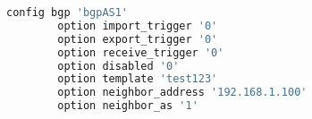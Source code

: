 \begin{lstlisting}[language=bash,caption={Tied options using UCI (I)}]
config bgp 'bgpAS1'
        option import_trigger '0'
        option export_trigger '0'
        option receive_trigger '0'
        option disabled '0'
        option template 'test123'
        option neighbor_address '192.168.1.100'
        option neighbor_as '1'
\end{lstlisting}
